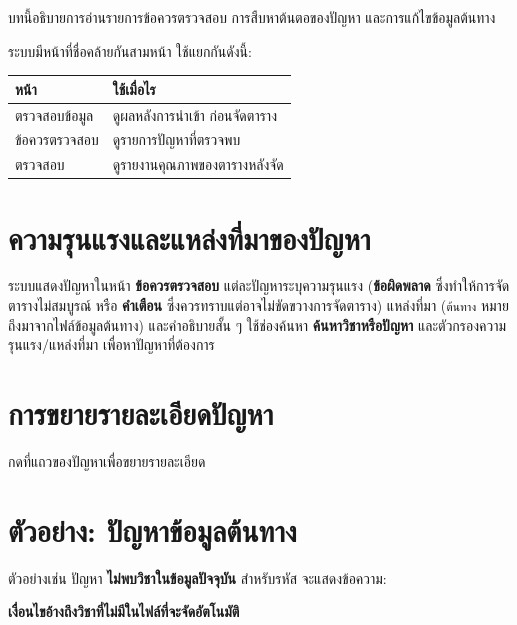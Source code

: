
\noindent บทนี้อธิบายการอ่านรายการข้อควรตรวจสอบ การสืบหาต้นตอของปัญหา และการแก้ไขข้อมูลต้นทาง

ระบบมีหน้าที่ชื่อคล้ายกันสามหน้า ใช้แยกกันดังนี้:

\begin{center}
\begin{tabular}{L{4cm}L{10cm}}
\toprule
\textbf{หน้า} & \textbf{ใช้เมื่อไร} \\
\midrule
ตรวจสอบข้อมูล & ดูผลหลังการนำเข้า ก่อนจัดตาราง \\
ข้อควรตรวจสอบ & ดูรายการปัญหาที่ตรวจพบ \\
ตรวจสอบ & ดูรายงานคุณภาพของตารางหลังจัด \\
\bottomrule
\end{tabular}
\end{center}

\section{ความรุนแรงและแหล่งที่มาของปัญหา}

ระบบแสดงปัญหาในหน้า \textbf{ข้อควรตรวจสอบ} แต่ละปัญหาระบุความรุนแรง
(\textbf{ข้อผิดพลาด} ซึ่งทำให้การจัดตารางไม่สมบูรณ์ หรือ \textbf{คำเตือน}
ซึ่งควรทราบแต่อาจไม่ขัดขวางการจัดตาราง) แหล่งที่มา
(\texttt{ต้นทาง} หมายถึงมาจากไฟล์ข้อมูลต้นทาง) และคำอธิบายสั้น ๆ
ใช้ช่องค้นหา \textbf{ค้นหาวิชาหรือปัญหา} และตัวกรองความรุนแรง/แหล่งที่มา
เพื่อหาปัญหาที่ต้องการ

\section{การขยายรายละเอียดปัญหา}

กดที่แถวของปัญหาเพื่อขยายรายละเอียด

\section{ตัวอย่าง: ปัญหาข้อมูลต้นทาง}

ตัวอย่างเช่น ปัญหา \textbf{ไม่พบวิชาในข้อมูลปัจจุบัน} สำหรับรหัส
 จะแสดงข้อความ:

\begin{center}
\textbf{เงื่อนไขอ้างถึงวิชาที่ไม่มีในไฟล์ที่จะจัดอัตโนมัติ}
\end{center}

